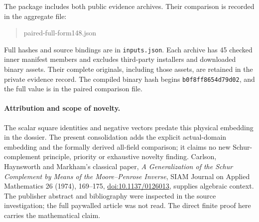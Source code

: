 The package includes both public evidence archives. Their comparison is
recorded in the aggregate file:
\begin{quote}\small\ttfamily
paired-full-form148.json
\end{quote}
Full hashes and source bindings are in \texttt{inputs.json}.
Each archive has 45 checked inner manifest
members and excludes third-party installers and downloaded binary assets.
Their complete originals, including those assets, are retained in the
private evidence record. The compiled binary hash begins
\texttt{b0f8ff8654d79d02}, and the full value is in the paired comparison file.

\paragraph{Attribution and scope of novelty.}
The scalar square identities and negative vectors predate this physical
embedding in the dossier. The present consolidation adds the explicit
actual-domain embedding and the formally derived all-field comparison;
it claims no new Schur-complement principle, priority or exhaustive novelty
finding. Carlson, Haynsworth and Markham's classical paper,
\emph{A Generalization of the Schur Complement by Means of the Moore--Penrose
Inverse}, SIAM Journal on Applied Mathematics 26 (1974), 169--175,
\href{https://doi.org/10.1137/0126013}{doi:10.1137/0126013}, supplies algebraic
context. The publisher abstract and bibliography were inspected in the
source investigation; the full paywalled article was not read. The direct
finite proof here carries the mathematical claim.
